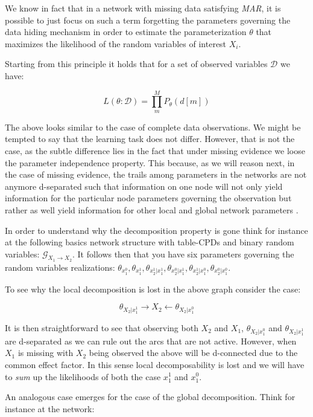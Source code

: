 \documentclass[11pt]{article}
\begin{document}
\begin{article}
We know in fact that in a network with missing data satisfying
\emph{MAR}, it is possible to just focus on such a term forgetting the
parameters governing the data hiding mechanism in order to estimate
the parameterization \(\theta\) that maximizes the likelihood of the
random variables of interest \(X_i\).

Starting from this principle it holds that for a set of observed
variables \(\mathscr{D}\) we have:

$$ L(\theta: \mathscr{D}) = \prod_m^M P_\theta(d[m]) $$

The above looks similar to the case of complete data
observations. We might be tempted to say that the learning task
does not differ. However, that is not the case, as the subtle
difference lies in the fact that under missing evidence we loose
the parameter independence property. This because, as we will
reason next, in the case of missing evidence, the trails among
parameters in the networks are not anymore d-separated such that
information on one node will not only yield information for the
particular node parameters governing the observation but rather as
well yield information for other local and global network
parameters .

In order to understand why the decomposition property is gone think
for instance at the following basics network structure with
table-CPDs and binary random variables: \(\mathscr{G}_{X_1
   \rightarrow X_2}\). It follows then that you have six parameters
governing the random variables realizations: \(\theta_{x_1^0},
   \theta_{x_1^1}, \theta_{x_2^1| x_1^1}, \theta_{x_2^0 | x_1^1},
   \theta_{x_2^1 | x_1^0}, \theta_{x_2^0 | x_1^0}\).

To see why the local decomposition is lost in the above graph
consider the case:

$$\theta_{X_2 | x_1^1} \rightarrow X_2 \leftarrow \theta_{X_2 |
   x_1^0}$$

It is then straightforward to see that observing both \(X_2\) and
\(X_1\), \(\theta_{X_2 | x_1^0}\) and \(\theta_{X_2 | x_1^1}\) are
d-separated as we can rule out the arcs that are not
active. However, when \(X_1\) is missing with \(X_2\) being observed
the above will be d-connected due to the common effect factor. In
this sense local decomposability is lost and we will have to \emph{sum}
up the likelihoods of both the case \(x_1^1\) and \(x_1^0\).

An analogous case emerges for the case of the global
decomposition. Think for instance at the network:


\end{article}
\end{document}
